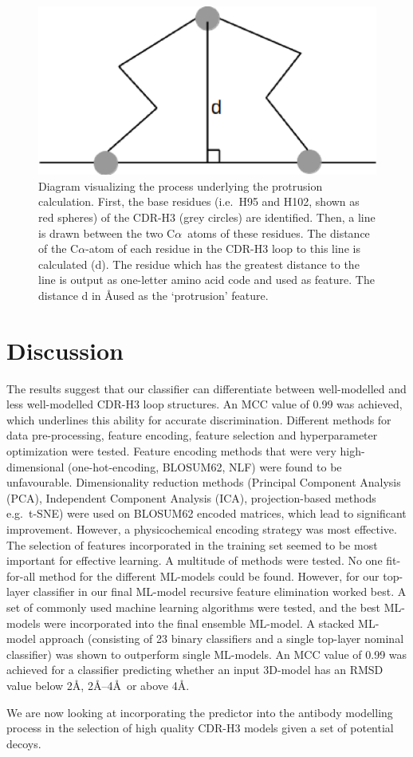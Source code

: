 \documentclass[12pt]{article}
\newcommand{\ca}{\mbox{C$\alpha$}}
\begin{document}
\begin{figure}
  \centering
  \includegraphics[scale=0.5]{protrusion.eps}
  \caption {Diagram
    visualizing the process underlying the protrusion
    calculation. First, the base residues (i.e.\ H95 and H102, shown as
    red spheres) of the CDR-H3 (grey circles) are identified. Then, a
    line is drawn between the two \ca\ atoms of these residues.
    The distance of the \ca-atom of each residue in the
    CDR-H3 loop to this line is calculated (d). The residue which has the
    greatest distance to the line is output
    as one-letter amino acid code and used as feature. The distance d in
    \AA\is used as the `protrusion'
    feature.}
  \label{fig:angle}
\end{figure}




\section{Discussion}
The results suggest that our classifier can differentiate
between well-modelled and less well-modelled CDR-H3 loop
structures. An MCC value of 0.99 was achieved, which underlines this
ability for accurate discrimination. Different methods for data
pre-processing, feature encoding, feature selection and hyperparameter
optimization were tested.
Feature encoding methods that were very high-dimensional
(one-hot-encoding, BLOSUM62, NLF) were found to be
unfavourable. Dimensionality reduction methods (Principal Component
Analysis (PCA), Independent Component Analysis (ICA), projection-based
methods e.g.\ t-SNE) were used on BLOSUM62 encoded matrices, which lead
to significant improvement. However, a physicochemical encoding
strategy was most effective.
The selection of features incorporated in the training set seemed to
be most important for effective learning. A multitude of methods were
tested. No one fit-for-all method for the different ML-models could be
found. However, for our top-layer classifier in our final ML-model
recursive feature elimination worked best.
A set of commonly used machine learning algorithms were tested, and
the best ML-models were incorporated into the final ensemble ML-model. A
stacked ML-model approach (consisting of 23 binary classifiers and a
single top-layer nominal classifier) was shown to outperform single
ML-models.
An MCC value of 0.99 was achieved for a classifier predicting whether
an input 3D-model has an RMSD value below 2\AA, 2\AA--4\AA\ or above
4\AA.

We are now looking at incorporating the predictor into the antibody
modelling process in the selection of high quality CDR-H3 models given
a set of potential decoys.



\end{document}
